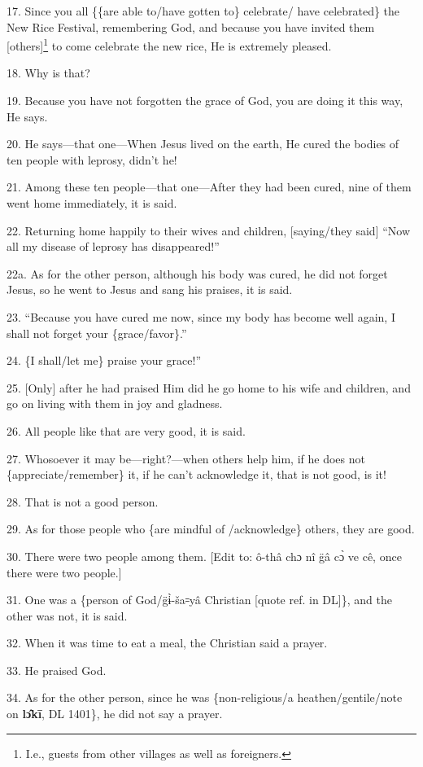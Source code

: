 17. Since you all \{\{are able to/have gotten to\} celebrate/ have celebrated\}
the New Rice Festival, remembering God, and because you have invited them [others]\footnote{I.e., guests from other villages as well as foreigners.}
to come celebrate the new rice, He is extremely pleased.

18. Why is that?

19. Because you have not forgotten the grace of God, you are doing it this way,
He says.

20. He says---that one---When Jesus lived on the earth, He cured the bodies of
ten people with leprosy, didn't he!

21. Among these ten people---that one---After they had been cured, nine of them
went home immediately, it is said.

22. Returning home happily to their wives and children, [saying/they said] ``Now
all my disease of leprosy has disappeared!''

22a. As for the other person, although his body was cured, he did not forget Jesus,
so he went to Jesus and sang his praises, it is said.

23. ``Because you have cured me now, since my body has become well again, I shall
not forget your \{grace/favor\}.''

24. \{I shall/let me\} praise your grace!''

25. [Only] after he had praised Him did he go home to his wife and children, and
go on living with them in joy and gladness.

26. All people like that are very good, it is said.

27. Whosoever it may be---right?---when others help him, if he does not \{appreciate/remember\}
it, if he can't acknowledge it, that is not good, is it!

28. That is not a good person.

29. As for those people who \{are mindful of /acknowledge\} others, they are good.

30. There were two people among them. [Edit to: ô-thâ chɔ nî g̈â cɔ̀ ve
cê, once there were two people.]

31. One was a \{person of God/g̈ɨ̀-ša꞊yâ Christian [quote ref. in DL]\},
and the other was not, it is said.

32. When it was time to eat a meal, the Christian said a prayer.

33. He praised God.

34. As for the other person, since he was \{non-religious/a heathen/gentile/note
on \textbf{lɔ̂kī}, DL 1401\}, he did not say a prayer.

